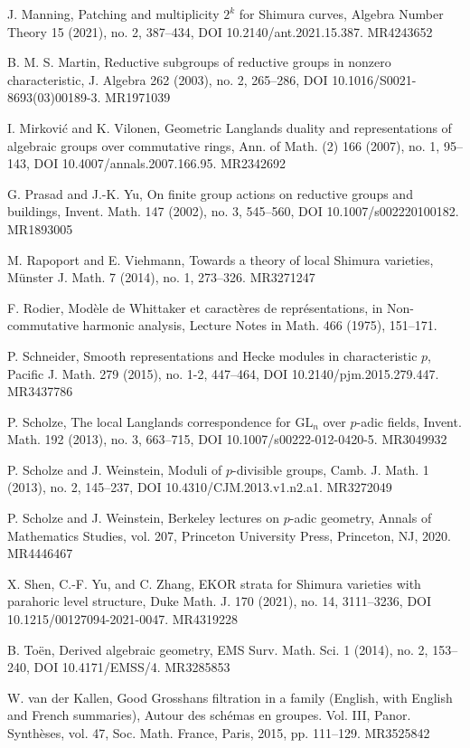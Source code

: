 \begin{refs}
\item[{[58]}] J. Manning, Patching and multiplicity $2^k$ for Shimura curves, Algebra Number Theory 15 (2021), no. 2, 387--434, DOI 10.2140/ant.2021.15.387. MR4243652
\item[{[59]}] B. M. S. Martin, Reductive subgroups of reductive groups in nonzero characteristic, J. Algebra 262 (2003), no. 2, 265--286, DOI 10.1016/S0021-8693(03)00189-3. MR1971039
\item[{[60]}] I. Mirkovi\'c and K. Vilonen, Geometric Langlands duality and representations of algebraic groups over commutative rings, Ann. of Math. (2) 166 (2007), no. 1, 95--143, DOI 10.4007/annals.2007.166.95. MR2342692
\item[{[61]}] G. Prasad and J.-K. Yu, On finite group actions on reductive groups and buildings, Invent. Math. 147 (2002), no. 3, 545--560, DOI 10.1007/s002220100182. MR1893005
\item[{[62]}] M. Rapoport and E. Viehmann, Towards a theory of local Shimura varieties, M\"unster J. Math. 7 (2014), no. 1, 273--326. MR3271247
\item[{[63]}] F. Rodier, Mod\`ele de Whittaker et caract\`eres de repr\'esentations, in Non-commutative harmonic analysis, Lecture Notes in Math. 466 (1975), 151--171.
\item[{[64]}] P. Schneider, Smooth representations and Hecke modules in characteristic $p$, Pacific J. Math. 279 (2015), no. 1-2, 447--464, DOI 10.2140/pjm.2015.279.447. MR3437786
\item[{[65]}] P. Scholze, The local Langlands correspondence for $\mathrm{GL}_n$ over $p$-adic fields, Invent. Math. 192 (2013), no. 3, 663--715, DOI 10.1007/s00222-012-0420-5. MR3049932
\item[{[66]}] P. Scholze and J. Weinstein, Moduli of $p$-divisible groups, Camb. J. Math. 1 (2013), no. 2, 145--237, DOI 10.4310/CJM.2013.v1.n2.a1. MR3272049
\item[{[67]}] P. Scholze and J. Weinstein, Berkeley lectures on $p$-adic geometry, Annals of Mathematics Studies, vol. 207, Princeton University Press, Princeton, NJ, 2020. MR4446467
\item[{[68]}] X. Shen, C.-F. Yu, and C. Zhang, EKOR strata for Shimura varieties with parahoric level structure, Duke Math. J. 170 (2021), no. 14, 3111--3236, DOI 10.1215/00127094-2021-0047. MR4319228
\item[{[69]}] B. To\"en, Derived algebraic geometry, EMS Surv. Math. Sci. 1 (2014), no. 2, 153--240, DOI 10.4171/EMSS/4. MR3285853
\item[{[70]}] W. van der Kallen, Good Grosshans filtration in a family (English, with English and French summaries), Autour des sch\'emas en groupes. Vol. III, Panor. Synth\`eses, vol. 47, Soc. Math. France, Paris, 2015, pp. 111--129. MR3525842

\end{refs}
